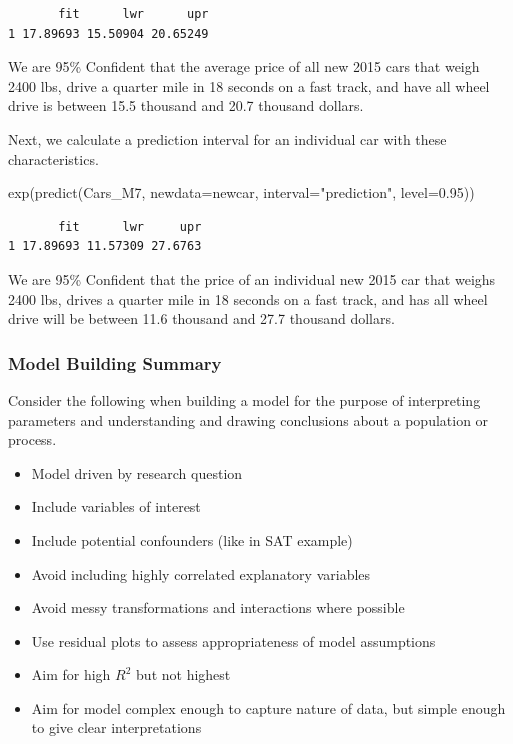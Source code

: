 \documentclass[
  letterpaper,
  DIV=11,
  numbers=noendperiod]{scrreprt}
\newenvironment{Shaded}{\begin{snugshade}}{\end{snugshade}}
\newcommand{\AttributeTok}[1]{\textcolor[rgb]{0.40,0.45,0.13}{#1}}
\newcommand{\FloatTok}[1]{\textcolor[rgb]{0.68,0.00,0.00}{#1}}
\newcommand{\FunctionTok}[1]{\textcolor[rgb]{0.28,0.35,0.67}{#1}}
\newcommand{\NormalTok}[1]{\textcolor[rgb]{0.00,0.23,0.31}{#1}}
\newcommand{\StringTok}[1]{\textcolor[rgb]{0.13,0.47,0.30}{#1}}
\providecommand{\tightlist}{%
  \setlength{\itemsep}{0pt}\setlength{\parskip}{0pt}}\usepackage{longtable,booktabs,array}
\begin{document}
\begin{verbatim}
       fit      lwr      upr
1 17.89693 15.50904 20.65249
\end{verbatim}

We are 95\% Confident that the average price of all new 2015 cars that
weigh 2400 lbs, drive a quarter mile in 18 seconds on a fast track, and
have all wheel drive is between 15.5 thousand and 20.7 thousand dollars.

Next, we calculate a prediction interval for an individual car with
these characteristics.

\begin{Shaded}
\begin{Highlighting}[]
\FunctionTok{exp}\NormalTok{(}\FunctionTok{predict}\NormalTok{(Cars\_M7, }\AttributeTok{newdata=}\NormalTok{newcar, }\AttributeTok{interval=}\StringTok{"prediction"}\NormalTok{, }\AttributeTok{level=}\FloatTok{0.95}\NormalTok{))}
\end{Highlighting}
\end{Shaded}

\begin{verbatim}
       fit      lwr     upr
1 17.89693 11.57309 27.6763
\end{verbatim}

We are 95\% Confident that the price of an individual new 2015 car that
weighs 2400 lbs, drives a quarter mile in 18 seconds on a fast track,
and has all wheel drive will be between 11.6 thousand and 27.7 thousand
dollars.

\subsubsection{Model Building Summary}\label{model-building-summary}

Consider the following when building a model for the purpose of
interpreting parameters and understanding and drawing conclusions about
a population or process.

\begin{itemize}
\tightlist
\item
  Model driven by research question
\item
  Include variables of interest\\
\item
  Include potential confounders (like in SAT example)\\
\item
  Avoid including highly correlated explanatory variables\\
\item
  Avoid messy transformations and interactions where possible\\
\item
  Use residual plots to assess appropriateness of model assumptions\\
\item
  Aim for high \(R^2\) but not highest\\
\item
  Aim for model complex enough to capture nature of data, but simple
  enough to give clear interpretations\\
\end{itemize}
\end{document}
